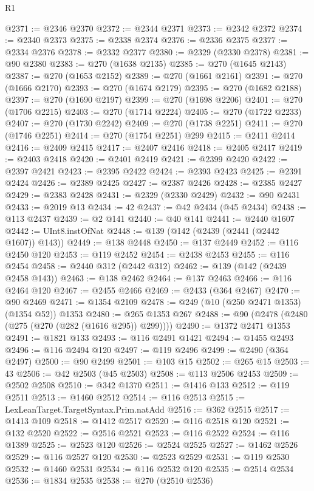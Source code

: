 \begin{lexlean}{R1}
\begin{coremodule}
@2371 := @2346 @2370
@2372 := @2344 @2371
@2373 := @2342 @2372
@2374 := @2340 @2373
@2375 := @2338 @2374
@2376 := @2336 @2375
@2377 := @2334 @2376
@2378 := @2332 @2377
@2380 := @2329 (@2330 @2378)
@2381 := @90 @2380
@2383 := @270 (@1638 @2135)
@2385 := @270 (@1645 @2143)
@2387 := @270 (@1653 @2152)
@2389 := @270 (@1661 @2161)
@2391 := @270 (@1666 @2170)
@2393 := @270 (@1674 @2179)
@2395 := @270 (@1682 @2188)
@2397 := @270 (@1690 @2197)
@2399 := @270 (@1698 @2206)
@2401 := @270 (@1706 @2215)
@2403 := @270 (@1714 @2224)
@2405 := @270 (@1722 @2233)
@2407 := @270 (@1730 @2242)
@2409 := @270 (@1738 @2251)
@2411 := @270 (@1746 @2251)
@2414 := @270 (@1754 @2251) @299
@2415 := @2411 @2414
@2416 := @2409 @2415
@2417 := @2407 @2416
@2418 := @2405 @2417
@2419 := @2403 @2418
@2420 := @2401 @2419
@2421 := @2399 @2420
@2422 := @2397 @2421
@2423 := @2395 @2422
@2424 := @2393 @2423
@2425 := @2391 @2424
@2426 := @2389 @2425
@2427 := @2387 @2426
@2428 := @2385 @2427
@2429 := @2383 @2428
@2431 := @2329 (@2330 @2429)
@2432 := @90 @2431
@2433 := @2019 @13
@2434 := 42
@2437 := @42 @2434 (@45 @2434)
@2438 := @113 @2437
@2439 := @2 @141
@2440 := @40 @141
@2441 := @2440 @1607
@2442 := UInt8.instOfNat
@2448 := @139 (@142 (@2439 (@2441 (@2442 @1607)) @143))
@2449 := @138 @2448
@2450 := @137 @2449
@2452 := @116 @2450 @120
@2453 := @119 @2452
@2454 := @2438 @2453
@2455 := @116 @2454
@2458 := @2440 @312 (@2442 @312)
@2462 := @139 (@142 (@2439 @2458 @143))
@2463 := @138 @2462
@2464 := @137 @2463
@2466 := @116 @2464 @120
@2467 := @2455 @2466
@2469 := @2433 (@364 @2467)
@2470 := @90 @2469
@2471 := @1354 @2109
@2478 := @249 (@10 (@250 @2471 @1353) (@1354 @52)) @1353
@2480 := @265 @1353 @267
@2488 := @90 (@2478 (@2480 (@275 (@270 (@282 (@1616 @295)) @299))))
@2490 := @1372 @2471 @1353
@2491 := @1821 @133
@2493 := @116 @2491 @1421
@2494 := @1455 @2493
@2496 := @116 @2494 @120
@2497 := @119 @2496
@2499 := @2490 (@364 @2497)
@2500 := @90 @2499
@2501 := @103 @15
@2502 := @265 @15
@2503 := 43
@2506 := @42 @2503 (@45 @2503)
@2508 := @113 @2506 @2453
@2509 := @2502 @2508
@2510 := @342 @1370
@2511 := @1416 @133
@2512 := @119 @2511
@2513 := @1460 @2512
@2514 := @116 @2513
@2515 := LexLeanTarget.TargetSyntax.Prim.natAdd
@2516 := @362 @2515
@2517 := @1413 @109
@2518 := @1412 @2517
@2520 := @116 @2518 @120
@2521 := @132 @2520
@2522 := @2516 @2521
@2523 := @116 @2522
@2524 := @116 @1389
@2525 := @2523 @120
@2526 := @2524 @2525
@2527 := @1462 @2526
@2529 := @116 @2527 @120
@2530 := @2523 @2529
@2531 := @119 @2530
@2532 := @1460 @2531
@2534 := @116 @2532 @120
@2535 := @2514 @2534
@2536 := @1834 @2535
@2538 := @270 (@2510 @2536)

\end{coremodule}
\end{lexlean}
